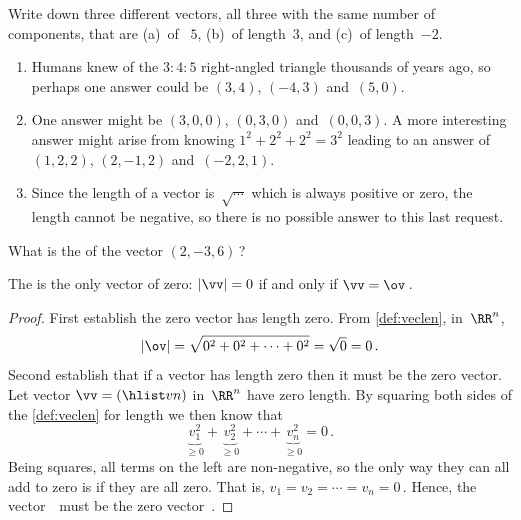 \begin{example} 
Write down three different vectors, all three with the same number of components, that are (a)~of ~\(5\), (b)~of length~\(3\), and (c)~of length~\(-2\).
\begin{solution} 
\begin{enumerate}
\item Humans knew of the \(3:4:5\) right-angled triangle thousands of years ago, so perhaps one answer could be \((3,4)\), \((-4,3)\) and~\((5,0)\).
\item One answer might be \((3,0,0)\), \((0,3,0)\) and~\((0,0,3)\). 
A more interesting answer might arise from knowing \(1^2+2^2+2^2=3^2\) leading to an answer of \((1,2,2)\), \((2,-1,2)\) and~\((-2,2,1)\).
\item Since the length of a vector is~\(\sqrt{\cdots}\) which is always positive or zero, the length cannot be negative, so there is no possible answer to this last request.
\end{enumerate}
 
\end{solution}
\end{example}




\begin{activity}
What is the  of the vector \((2,-3,6)\)\,?
\end{activity}




\begin{theorem} \label{thm:veclen0}
The  is the only vector of  zero:
 \(|\vv|=0\) if and only if \(\vv=\ov\)\,.
\end{theorem}

\begin{proof} 
First establish the zero vector has length zero.
From \cref{def:veclen}, in~\(\RR^n\),
\begin{equation*}
|\ov|=\sqrt{0^2+0^2+\cdots+0^2}=\sqrt{0}=0\,.
\end{equation*}
Second establish that if a vector has length zero then it must be the zero vector.
Let vector \(\vv=(\hlist vn)\) in~\(\RR^n\) have zero length.
By squaring both sides of the \cref{def:veclen} for length we then know that
\begin{equation*}
\underbrace{v_1^2}_{\geq0}+\underbrace{v_2^2}_{\geq0}
+\cdots+\underbrace{v_n^2}_{\geq0}=0\,.
\end{equation*}
Being squares, all terms on the left are non-negative, so the only way they can all add to zero is if they are all zero.
That is, \(v_1=v_2=\cdots=v_n=0\)\,.
Hence, the vector~\vv\ must be the zero vector~\ov.
\end{proof}






